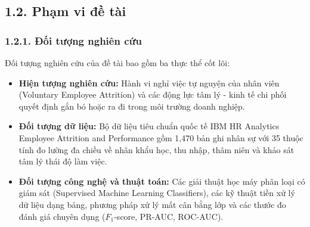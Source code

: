 \documentclass[12pt,a4paper]{article}
\begin{document}
\subsection{1.2. Phạm vi đề tài}

\subsubsection{1.2.1. Đối tượng nghiên cứu}
Đối tượng nghiên cứu của đề tài bao gồm ba thực thể cốt lõi:
\begin{itemize}
    \item \textbf{Hiện tượng nghiên cứu:} Hành vi nghỉ việc tự nguyện của nhân viên (Voluntary Employee Attrition) và các động lực tâm lý - kinh tế chi phối quyết định gắn bó hoặc ra đi trong môi trường doanh nghiệp.
    \item \textbf{Đối tượng dữ liệu:} Bộ dữ liệu tiêu chuẩn quốc tế IBM HR Analytics Employee Attrition and Performance gồm 1,470 bản ghi nhân sự với 35 thuộc tính đo lường đa chiều về nhân khẩu học, thu nhập, thâm niên và khảo sát tâm lý thái độ làm việc.
    \item \textbf{Đối tượng công nghệ và thuật toán:} Các giải thuật học máy phân loại có giám sát (Supervised Machine Learning Classifiers), các kỹ thuật tiền xử lý dữ liệu dạng bảng, phương pháp xử lý mất cân bằng lớp và các thước đo đánh giá chuyên dụng ($F_1$-score, PR-AUC, ROC-AUC).\n\end{itemize}
\end{document}
